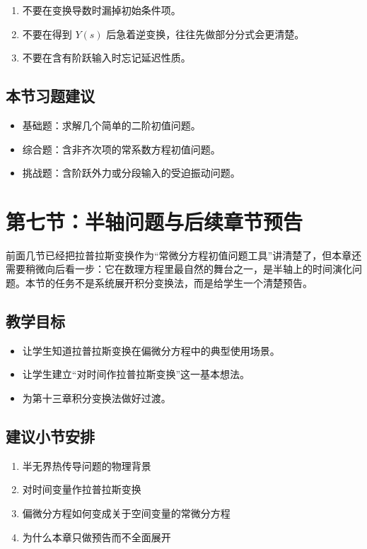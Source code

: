 \begin{jinshi}[本节易错点]
\begin{enumerate}
    \item 不要在变换导数时漏掉初始条件项。
    \item 不要在得到 $Y(s)$ 后急着逆变换，往往先做部分分式会更清楚。
    \item 不要在含有阶跃输入时忘记延迟性质。
\end{enumerate}
\end{jinshi}

\subsection*{本节习题建议}
\begin{itemize}
    \item 基础题：求解几个简单的二阶初值问题。
    \item 综合题：含非齐次项的常系数方程初值问题。
    \item 挑战题：含阶跃外力或分段输入的受迫振动问题。
\end{itemize}

\section{第七节：半轴问题与后续章节预告}

\begin{wulibj}[本节要解决的问题]
前面几节已经把拉普拉斯变换作为``常微分方程初值问题工具''讲清楚了，但本章还需要稍微向后看一步：它在数理方程里最自然的舞台之一，是半轴上的时间演化问题。本节的任务不是系统展开积分变换法，而是给学生一个清楚预告。
\end{wulibj}

\subsection*{教学目标}
\begin{itemize}
    \item 让学生知道拉普拉斯变换在偏微分方程中的典型使用场景。
    \item 让学生建立``对时间作拉普拉斯变换''这一基本想法。
    \item 为第十三章积分变换法做好过渡。
\end{itemize}

\subsection*{建议小节安排}
\begin{enumerate}
    \item 半无界热传导问题的物理背景
    \item 对时间变量作拉普拉斯变换
    \item 偏微分方程如何变成关于空间变量的常微分方程
    \item 为什么本章只做预告而不全面展开
\end{enumerate}

